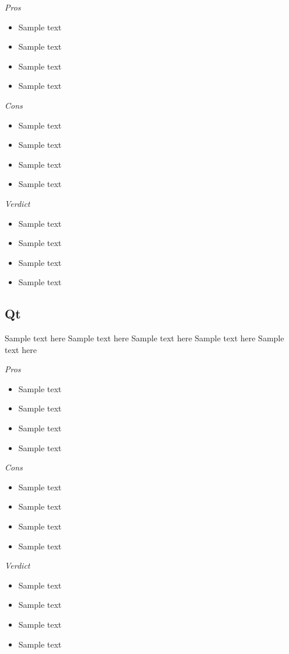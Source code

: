 \documentclass[11pt]{article}
\begin{document}
\emph{Pros}
\begin{itemize}
  \setlength{\itemsep}{0mm}  
  \item Sample text
  \item Sample text
  \item Sample text
  \item Sample text
\end{itemize}
\par
\emph{Cons}
\begin{itemize}
  \setlength{\itemsep}{0mm}  
  \item Sample text
  \item Sample text
  \item Sample text
  \item Sample text
\end{itemize}
\par
\emph{Verdict}
\begin{itemize}
  \setlength{\itemsep}{0mm}  
  \item Sample text
  \item Sample text
  \item Sample text
  \item Sample text
\end{itemize}


\subsection{Qt}

Sample text here
Sample text here
Sample text here
Sample text here
Sample text here \par

\emph{Pros}
\begin{itemize}
  \setlength{\itemsep}{0mm}  
  \item Sample text
  \item Sample text
  \item Sample text
  \item Sample text
\end{itemize}
\par
\emph{Cons}
\begin{itemize}
  \setlength{\itemsep}{0mm}  
  \item Sample text
  \item Sample text
  \item Sample text
  \item Sample text
\end{itemize}
\par
\emph{Verdict}
\begin{itemize}
  \setlength{\itemsep}{0mm}  
  \item Sample text
  \item Sample text
  \item Sample text
  \item Sample text
\end{itemize}
\end{document}
